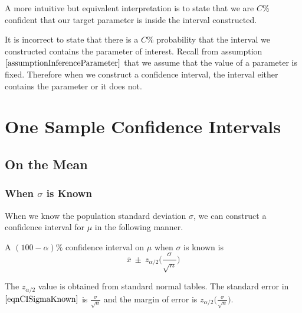 \begin{nt}
A more intuitive but equivalent interpretation is to state that we are $C$\% confident that our target parameter is inside the interval constructed.
\end{nt}

It is incorrect to state that there is a $C\%$ probability that 
the interval we constructed contains the parameter of interest.
Recall from assumption $\ref{assumptionInferenceParameter}$ that we assume that the value of a parameter is fixed. Therefore when we construct a confidence interval, the interval either contains the parameter or it does not.


\section{One Sample Confidence Intervals}

\subsection{On the Mean}

\subsubsection{When $\sigma$ is Known}


When we know the population standard deviation $\sigma$, we can construct a confidence interval for $\mu$ in the following manner.

\begin{ci}
A $(100 - \alpha)\%$ confidence interval on $\mu$ when $\sigma$ is known
is 
\begin{equation}\label{eqnCISigmaKnown}
\bar{x}	~\pm~	z_{\alpha / 2}  \bigg( \frac{\sigma}{ \sqrt{n} } \bigg)
\end{equation}
\end{ci}

\noindent
The $z_{\alpha/2}$ value is obtained from standard normal tables. The standard error in $\ref{eqnCISigmaKnown}$ is $ \frac{\sigma}{ \sqrt{n} }$
and the margin of error is $z_{\alpha / 2} \bigg( \frac{\sigma}{ \sqrt{n} } \bigg)$.


